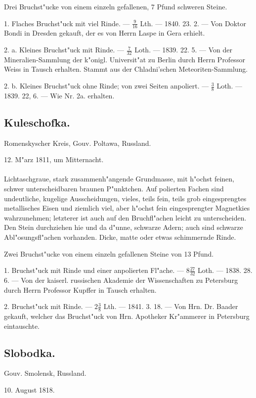 \documentclass[a4paper, 11pt, oneside, polutonikogreek, german]{article}
\begin{document}
Drei Bruchst"ucke von einem einzeln gefallenen, 7 Pfund schweren Steine.

1. Flaches Bruchst"uck mit viel Rinde. --- $\frac{9}{16}$ Lth. --- 1840. 23. 2. --- Von Doktor Bondi in Dresden gekauft, der es von Herrn Laspe in Gera erhielt.

2. a. Kleines Bruchst"uck mit Rinde. --- $\frac{7}{32}$ Loth. --- 1839. 22. 5. --- Von der Mineralien-Sammlung der k"onigl. Universit"at zu Berlin durch Herrn Professor Weiss in Tausch erhalten. Stammt aus der Chladni'schen Meteoriten-Sammlung.

2. b. Kleines Bruchst"uck ohne Rinde; von zwei Seiten anpoliert. --- $\frac{3}{8}$ Loth. --- 1839. 22, 6. --- Wie Nr. 2a. erhalten.
\subsection{Kuleschofka.}
\begin{center}
\small
Romenskyscher Kreis, Gouv. Poltawa, Russland.

12. M"arz 1811, um Mitternacht.
\end{center}
\paragraph{}
Lichtaschgraue, stark zusammenh"angende Grundmasse, mit h"ochst feinen, schwer unterscheidbaren braunen P"unktchen. Auf polierten Fachen sind undeutliche, kugelige Ausscheidungen, vieles, teils fein, teils grob eingesprengtes metallisches Eisen und ziemlich viel, aber h"ochst fein eingesprengter Magnetkies wahrzunehmen; letzterer ist auch auf den Bruchfl"achen leicht zu unterscheiden. Den Stein durchziehen hie und da d"unne, schwarze Adern; auch sind schwarze Abl"osungsfl"achen vorhanden. Dicke, matte oder etwas schimmernde Rinde.

Zwei Bruchst"ucke von einem einzeln gefallenen Steine von 13 Pfund.

1. Bruchst"uck mit Rinde und einer anpolierten Fl"ache. --- $8\frac{27}{32}$ Loth. --- 1838. 28. 6. --- Von der kaiserl. russischen Akademie der Wissenschaften zu Petersburg durch Herrn Professor Kupffer in Tausch erhalten.

2. Bruchst"uck mit Rinde. --- $2\frac{3}{8}$ Lth. --- 1841. 3. 18. --- Von Hrn. Dr. Baader gekauft, welcher das Bruchst"uck von Hrn. Apotheker Kr"ammerer in Petersburg eintauschte.
\subsection{Slobodka.}
\begin{center}
\small
Gouv. Smolensk, Russland.

10. August 1818.
\end{center}
\end{document}
